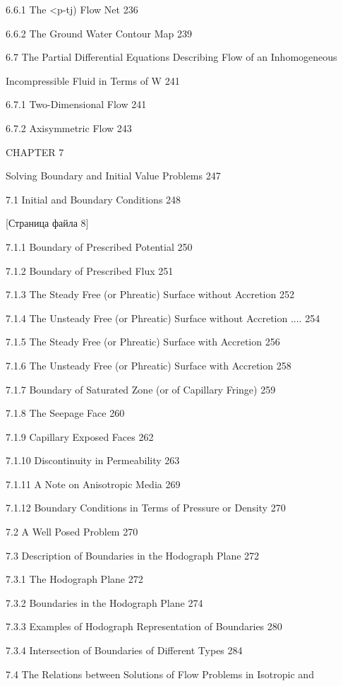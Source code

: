 \documentclass[
  11pt,
]{article}
\begin{document}
6.6.1 The \textless p-tj) Flow Net 236 \par
6.6.2 The Ground Water Contour Map 239 \par
6.7 The Partial Differential Equations Describing Flow of an Inhomogeneous \par
Incompressible Fluid in Terms of W 241 \par
6.7.1 Two-Dimensional Flow 241 \par
6.7.2 Axisymmetric Flow 243 \par
CHAPTER 7 \par
Solving Boundary and Initial Value Problems 247 \par
7.1 Initial and Boundary Conditions 248 \par
\smallskip
\smallskip
\smallskip
{[}Страница файла 8{]}\par
7.1.1 Boundary of Prescribed Potential 250 \par
7.1.2 Boundary of Prescribed Flux 251 \par
7.1.3 The Steady Free (or Phreatic) Surface without Accretion 252 \par
7.1.4 The Unsteady Free (or Phreatic) Surface without Accretion .... 254 \par
7.1.5 The Steady Free (or Phreatic) Surface with Accretion 256 \par
7.1.6 The Unsteady Free (or Phreatic) Surface with Accretion 258 \par
7.1.7 Boundary of Saturated Zone (or of Capillary Fringe) 259 \par
7.1.8 The Seepage Face 260 \par
7.1.9 Capillary Exposed Faces 262 \par
7.1.10 Discontinuity in Permeability 263 \par
7.1.11 A Note on Anisotropic Media 269 \par
7.1.12 Boundary Conditions in Terms of Pressure or Density 270 \par
7.2 A Well Posed Problem 270 \par
7.3 Description of Boundaries in the Hodograph Plane 272 \par
7.3.1 The Hodograph Plane 272 \par
7.3.2 Boundaries in the Hodograph Plane 274 \par
7.3.3 Examples of Hodograph Representation of Boundaries 280 \par
7.3.4 Intersection of Boundaries of Different Types 284 \par
7.4 The Relations between Solutions of Flow Problems in Isotropic and  \par
\end{document}
